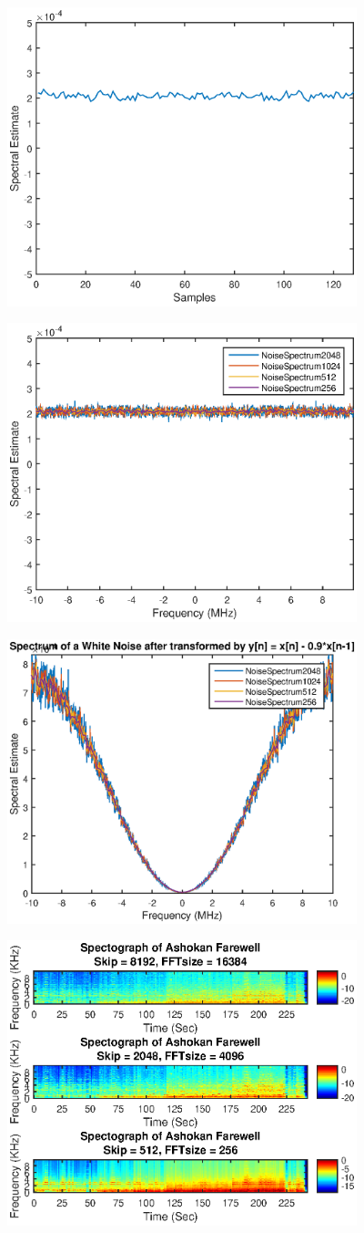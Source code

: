 \documentclass[12pt]{article}
\begin{document}
\includegraphics [width=4in]{projMain_01.eps}

\includegraphics [width=4in]{projMain_02.eps}

\includegraphics [width=4in]{projMain_03.eps}

\includegraphics [width=4in]{projMain_04.eps}
\end{document}
